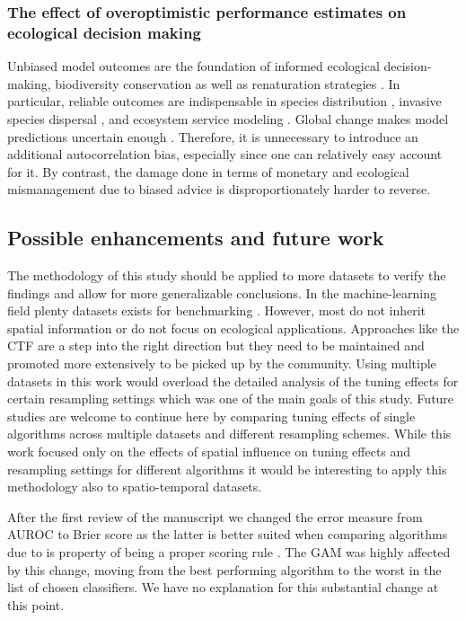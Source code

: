 \documentclass[review]{elsarticle}
\begin{document}
\subsubsection{The effect of overoptimistic performance estimates on ecological decision making}
\noindent Unbiased model outcomes are the foundation of informed ecological decision-making, biodiversity conservation as well as renaturation strategies \citep{muenchowReviewEcologicalGradient2018}. 
In particular, reliable outcomes are indispensable in species distribution \citep{loehleDisequilibriumRelaxationTimes2018}, invasive species dispersal \citep{srivastavaMappingInvasionPotential2018}, and ecosystem service modeling \citep{watanabeDynamicEmergyAccounting2014}. 
Global change makes model predictions uncertain enough \citep{ipccSummaryPolicymakers2013}. 
Therefore, it is unnecessary to introduce an additional autocorrelation bias, especially since one can relatively easy account for it. 
By contrast, the damage done in terms of monetary and ecological mismanagement due to biased advice is disproportionately harder to reverse.

\subsection{Possible enhancements and future work}

The methodology of this study should be applied to more datasets to verify the findings and allow for more generalizable conclusions. 
In the machine-learning field plenty datasets exists for benchmarking \citep{olsonPMLBLargeBenchmark2017, vanschorenOpenMLNetworkedScience2014}.
However, most do not inherit spatial information or do not focus on ecological applications.
Approaches like the \ac{CTF} \citep{wikleCommonTaskFramework2017} are a step into the right direction but they need to be maintained and promoted more extensively to be picked up by the community.
Using multiple datasets in this work would overload the detailed analysis of the tuning effects for certain resampling settings which was one of the main goals of this study.
Future studies are welcome to continue here by comparing tuning effects of single algorithms across multiple datasets and different resampling schemes.
While this work focused only on the effects of spatial influence on tuning effects and resampling settings for different algorithms it would be interesting to apply this methodology also to spatio-temporal datasets.

After the first review of the manuscript we changed the error measure from \ac{AUROC} to Brier score as the latter is better suited when comparing algorithms due to is property of being a proper scoring rule \citep{Byrne2016, Gneiting2007}. 
The GAM was highly affected by this change, moving from the best performing algorithm to the worst in the list of chosen classifiers.
We have no explanation for this substantial change at this point.
\end{document}
